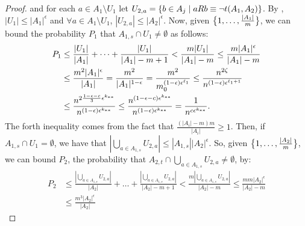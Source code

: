 \begin{lemma}
\begin{proof}
                and for each $a \in A_1 \setminus U_1$ let $U_{2,a} = \{ b \in A_j \mid a R b \equiv \neg t(A_1, A_2) \}$.
                By , $|U_1| \leq |A_1|^\epsilon$ and $\forall a \in A_1 \setminus U_1$,
                $|U_{2,a}| \leq |A_2|^\epsilon$.
                Now, given $\bigl\{ 1, \dots, \frac{|A_1|}{m} \bigr\}$, we can bound the probability $P_1$ that
                $A_{1,s} \cap U_1 \neq \emptyset$ as follows:
                \[
                    \begin{split}
                        P_1
                            & \leq \frac{|U_1|}{|A_1|} + \dots + \frac{|U_1|}{|A_1|-m+1}
                                < \frac{m |U_1|}{|A_1| - m}
                                \leq \frac{m |A_1|^\epsilon}{|A_1| - m} \\
                            & \leq \frac{m^2 |A_1|^\epsilon}{|A_1|}
                                = \frac{m^2}{|A_1|^{1-\epsilon}}
                                = \frac{m^2}{m_0^{\parround{1-\epsilon} \epsilon^{\ell_1}}} %
                                \leq \frac{n^{2 \zeta}}{n^{(1-\epsilon)\epsilon^{\ell_1 + 1}}} \\
                            & \leq \frac{n^{2\frac{1-\epsilon-c}{3} \epsilon^{k_{**}}}}{n^{(1-\epsilon)\epsilon^{k_{**}}}}
                                \leq \frac{n^{(1-\epsilon-c) \epsilon^{k_{**}}}}{n^{(1-\epsilon)\epsilon^{k_{**}}}}
                                = \frac{1}{n^{c \epsilon^{k_{**}}}}.
                    \end{split}
                \]
                The forth inequality comes from the fact that $\frac{(|A_i| - m) m}{|A_i|} \geq 1$.
                Then, if $A_{1,s} \cap U_1= \emptyset$, we have that $|\bigcup_{a \in A_{1,s}} U_{2,a}| \leq |A_{1,s}| |A_2|^\epsilon$.
                So, given $\bigl\{ 1, \dots, \frac{|A_2|}{m} \bigr\}$, we can bound $P_2$, the probability that
                $A_{2,t} \cap \bigcup_{a \in A_{1,s}} U_{2,a} \neq \emptyset$, by:
                \[
                    \begin{split}
                        P_2
                            & \leq \frac{|\bigcup_{a \in A_{1,s}} U_{2,a}|}{|A_2|} + \dots + \frac{|\bigcup_{a \in A_{1,s}} U_{2,a}|}{|A_2|-m+1}
                                < \frac{m |\bigcup_{a \in A_{1,s}} U_{2,a}|}{|A_2| - m}
                                \leq \frac{m m |A_2|^\epsilon}{|A_2| - m} \\
                            & \leq \frac{m^3 |A_2|^\epsilon}{|A_2|}

\end{split}\]
\end{proof}
\end{lemma}

